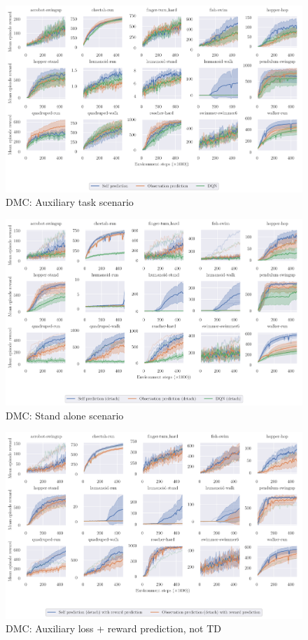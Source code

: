 \begin{figure}
    \centering
    \includegraphics[width=\textwidth]{figures/understanding/rlc2024_mujoco.pdf}
    \caption{DMC: Auxiliary task scenario}
    \label{fig:muj_aux}
\end{figure}

\begin{figure}
    \centering
    \includegraphics[width=\textwidth]{figures/understanding/rlc2024-detach_mujoco.pdf}
    \caption{DMC: Stand alone scenario}
    \label{fig:muj_sta}
\end{figure}

\begin{figure}
    \centering
    \includegraphics[width=\textwidth]{figures/understanding/rlc2024-rew-detach_mujoco.pdf}
    \caption{DMC: Auxiliary loss + reward prediction, not TD}
    \label{fig:muj_sta_rew}
\end{figure}

